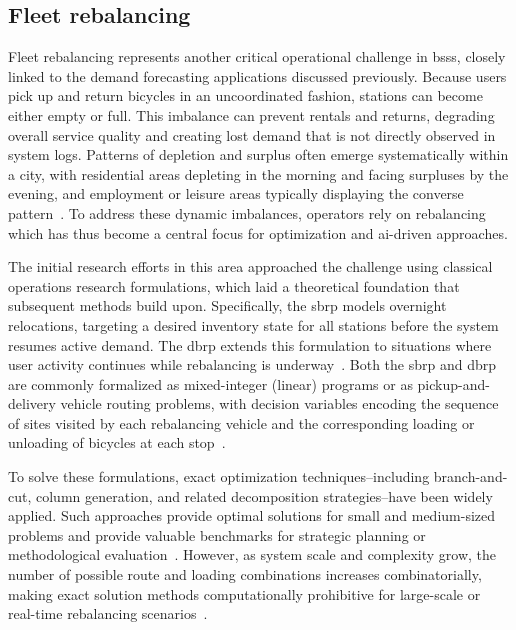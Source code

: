     \subsection{Fleet rebalancing}

    Fleet rebalancing represents another critical operational challenge in \acp{bss}, closely linked to the demand forecasting applications discussed previously. Because users pick up and return bicycles in an uncoordinated fashion, stations can become either empty or full. This imbalance can prevent rentals and returns, degrading overall service quality and creating lost demand that is not directly observed in system logs. Patterns of depletion and surplus often emerge systematically within a city, with residential areas depleting in the morning and facing surpluses by the evening, and employment or leisure areas typically displaying the converse pattern~\cite{Chiariotti2018}. To address these dynamic imbalances, operators rely on rebalancing which has thus become a central focus for optimization and \ac{ai}-driven approaches.

    The initial research efforts in this area approached the challenge using classical operations research formulations, which laid a theoretical foundation that subsequent methods build upon. Specifically, the \ac{sbrp} models overnight relocations, targeting a desired inventory state for all stations before the system resumes active demand. The \ac{dbrp} extends this formulation to situations where user activity continues while rebalancing is underway~\cite{Raviv2013}. Both the \ac{sbrp} and \ac{dbrp} are commonly formalized as mixed-integer (linear) programs or as pickup-and-delivery vehicle routing problems, with decision variables encoding the sequence of sites visited by each rebalancing vehicle and the corresponding loading or unloading of bicycles at each stop~\cite{Raviv2013, Chemla2013, DellAmico2014}.

    To solve these formulations, exact optimization techniques--including branch-and-cut, column generation, and related decomposition strategies--have been widely applied. Such approaches provide optimal solutions for small and medium-sized problems and provide valuable benchmarks for strategic planning or methodological evaluation~\cite{Chemla2013, DellAmico2014}. However, as system scale and complexity grow, the number of possible route and loading combinations increases combinatorially, making exact solution methods computationally prohibitive for large-scale or real-time rebalancing scenarios~\cite{Schuijbroek2017}.

